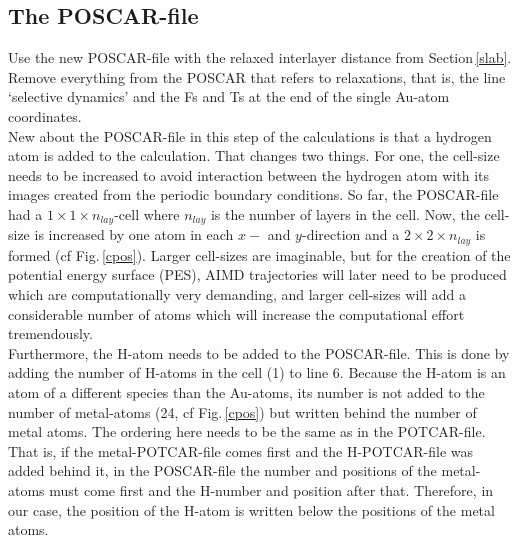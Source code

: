 \documentclass[11pt,oneside,a4paper, captions=nooneline, headsepline]{article}%
\begin{document}
\subsection{The POSCAR-file}
Use the new POSCAR-file with the relaxed interlayer distance from Section\,\ref{slab}. Remove everything from the POSCAR that refers to relaxations, that is, the line `selective dynamics' and the Fs and Ts at the end of the single Au-atom coordinates.\\
New about the POSCAR-file in this step of the calculations is that a hydrogen atom is added to the calculation. That changes two things. For one, the cell-size needs to be increased to avoid interaction between the hydrogen atom with its images created from the periodic boundary conditions. So far, the POSCAR-file had a $1\times1\times n_{lay}$-cell where $n_{lay}$ is the number of layers in the cell. Now, the cell-size is increased by one atom in each $x-$ and $y$-direction and a $2\times2\times n_{lay}$ is formed (cf Fig.\,\ref{cpos}). Larger cell-sizes are imaginable, but for the creation of the potential energy surface (PES), AIMD trajectories will later need to be produced which are computationally very demanding, and larger cell-sizes will add a considerable number of atoms which will increase the computational effort tremendously.\\
Furthermore, the H-atom needs to be added to the POSCAR-file. This is done by adding the number of H-atoms in the cell (1) to line 6. Because the H-atom is an atom of a different species than the Au-atoms, its number is not added to the number of metal-atoms (24, cf Fig.\,\ref{cpos}) but written behind the number of metal atoms. The ordering here needs to be the same as in the POTCAR-file. That is, if the metal-POTCAR-file comes first and the H-POTCAR-file was added behind it, in the POSCAR-file the number and positions of the metal-atoms must come first and the H-number and position after that. Therefore, in our case, the position of the H-atom is written below the positions of the metal atoms.
\end{document}
